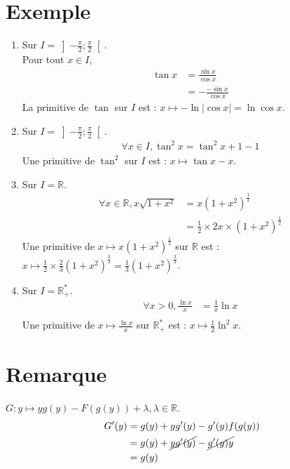 \documentclass[../main.tex]{subfiles}
\begin{document}
\section{Exemple}
\begin{enumerate}
    \item Sur $I = \left]-\frac{\pi}{2} ; \frac{\pi}{2} \right[$. \\
    Pour tout $x \in I$, 
    \begin{align*}
        \tan x &= \frac{\sin x}{\cos x} \\
        &= -\frac{- \sin x}{\cos x}
    \end{align*}
    La primitive de $\tan$ sur $I$ est : $x \mapsto -\ln |\cos x| = \ln \cos x$.\\

    \item Sur $I = \left] -\frac{\pi}{2} ; \frac{\pi}{2} \right[$. \\
    \begin{align*}
        \forall x \in I, \tan^2 x = \tan^2 x + 1 - 1
    \end{align*}
    Une primitive de $\tan^2$ sur $I$ est : $x \mapsto \tan x - x$. \\

    \item Sur $I = \mathbb{R}$. \\
    \begin{align*}
        \forall x \in \mathbb{R}, x \sqrt{1 + x^2} &= x(1 + x^2)^{\frac{1}{2}} \\
        &= \frac{1}{2} \times 2x \times (1 + x^2)^{\frac{1}{2}} 
    \end{align*}
    Une primitive de $x \mapsto x(1 + x^2)^{\frac{1}{2}}$ sur $\mathbb{R}$ est : $x \mapsto \frac{1}{2} \times \frac{2}{3}(1 + x^2)^{\frac{3}{2}} = \frac{1}{3} (1 + x^2)^{\frac{3}{2}}$.

    \item Sur $I = \mathbb{R}_+^*$. 
    \begin{align*}
        \forall x > 0, \frac{\ln x}{x} &= \frac{1}{x} \ln x \\
    \end{align*}
    Une primitive de $x \mapsto \frac{\ln x}{x}$ sur $\mathbb{R}_+^*$ est : $x \mapsto \frac{1}{2} \ln^2 x$.
\end{enumerate}

\setcounter{section}{64}
\section{Remarque}
$G:y \mapsto y g(y) - F(g(y)) + \lambda, \lambda \in \mathbb{R}$. 
\begin{align*}
    G'(y) &= g(y) + y g'(y) - g'(y) f(g(y)) \\
    &= g(y) + \cancel{y g'(y)} - \cancel{g'(y) y} \\
    &= g(y)
\end{align*}
\end{document}
